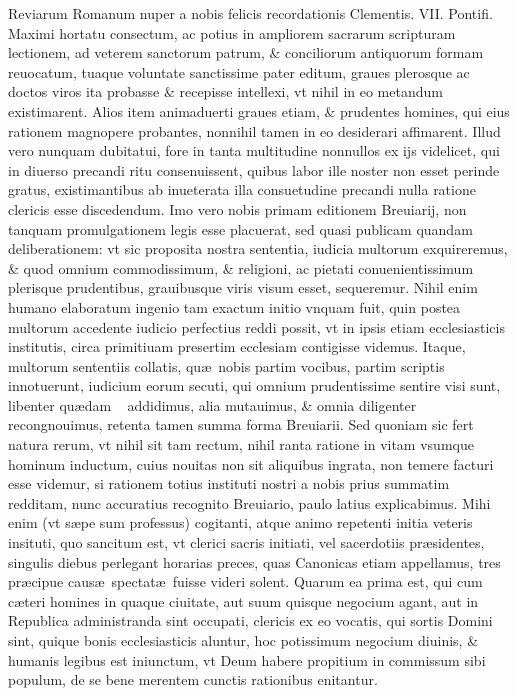 \documentclass[a5paper,10pt]{book}
\def\ae{æ}
\begin{document}
Reviarum Romanum nuper a nobis felicis recordationis Clementis. VII. Pontifi. Maximi hortatu consectum, ac potius in ampliorem sacrarum scripturam lectionem, ad veterem sanctorum patrum, \& conciliorum antiquorum formam reuocatum, tuaque voluntate sanctissime pater editum, graues plerosque ac doctos viros ita probasse \& recepisse intellexi, vt nihil in eo metandum existimarent.
Alios item animaduerti graues etiam, \& prudentes homines, qui eius rationem magnopere probantes, nonnihil tamen in eo desiderari affimarent.
Illud vero nunquam dubitatui, fore in tanta multitudine nonnullos ex ijs videlicet, qui in diuerso precandi ritu consenuissent, quibus labor ille noster non esset perinde gratus, existimantibus ab inueterata illa consuetudine precandi nulla ratione clericis esse discedendum.
Imo vero nobis primam editionem Breuiarij, non tanquam promulgationem legis esse placuerat, sed quasi publicam quandam deliberationem:
vt sic proposita nostra sententia, iudicia multorum exquireremus, \& quod omnium commodissimum, \& religioni, ac pietati conuenientissimum plerisque prudentibus, grauibusque viris visum esset, sequeremur.
Nihil enim humano elaboratum ingenio tam exactum initio vnquam fuit, quin postea multorum accedente iudicio perfectius reddi possit, vt in ipsis etiam ecclesiasticis institutis, circa primitiuam presertim ecclesiam contigisse videmus.
Itaque, multorum sententiis 
collatis, qu\ae \ nobis partim vocibus, partim scriptis innotuerunt, iudicium eorum secuti, qui omnium prudentissime sentire visi sunt, libenter qu\ae dam \ %
addidimus, alia mutauimus, \& omnia diligenter recongnouimus, retenta tamen summa forma Breuiarii.
Sed quoniam sic fert natura rerum, vt nihil sit tam rectum, nihil ranta ratione in vitam vsumque hominum inductum, cuius nouitas non sit aliquibus ingrata, non temere facturi esse videmur, si rationem totius instituti nostri a nobis prius summatim redditam, nunc accuratius recognito Breuiario, paulo latius explicabimus.
Mihi enim (vt s\ae pe sum professus) cogitanti, atque animo repetenti initia veteris insituti, quo sancitum est, vt clerici sacris initiati, vel sacerdotiis pr\ae sidentes, singulis diebus perlegant horarias preces, quas Canonicas etiam appellamus, tres pr\ae cipue caus\ae \ spectat\ae \ fuisse videri solent.
Quarum ea prima est, qui cum c\ae teri homines in quaque ciuitate, aut suum quisque negocium agant, aut in Republica administranda sint occupati, clericis ex eo vocatis, qui sortis Domini sint, quique bonis ecclesiasticis aluntur, hoc potissimum negocium diuinis, \& humanis legibus est iniunctum, vt Deum habere propitium in commissum sibi populum, de se bene merentem cunctis rationibus enitantur.
\end{document}
